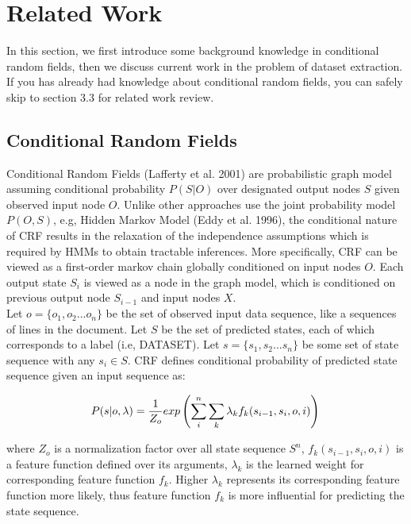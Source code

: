 \documentclass[10pt]{article}
\begin{document}
\section{Related Work}
In this section, we first introduce some background knowledge in conditional random fields, then we discuss current work in the problem of dataset extraction. If you has already had knowledge about conditional random fields, you can safely skip to section 3.3 for related work review.

\subsection{Conditional Random Fields}
Conditional Random Fields (Lafferty et al. 2001) are probabilistic graph model assuming conditional probability $P(S|O)$ over designated output nodes $S$ given observed input node $O$. Unlike other approaches use the joint probability model $P(O,S)$, e.g, Hidden Markov Model (Eddy et al. 1996), the conditional nature of CRF results in the relaxation of the independence assumptions which is required by HMMs to obtain tractable inferences. More specifically, CRF can be viewed as a first-order markov chain globally conditioned on input nodes $O$. Each output state $S_i$ is viewed as a node in the graph model, which is conditioned on previous output node $S_{i-1}$ and input nodes $X$. \\

Let $o =\{o_1, o_2 ... o_n \}$ be the set of observed input data sequence, like a sequences of lines in the document. Let $S$ be the set of predicted states, each of which corresponds to a label (i.e, DATASET). Let $s = \{ s_1, s_2 ... s_n\}$ be some set of state sequence with any $s_i \in S$. CRF defines conditional probability of predicted state sequence given an input sequence as: 

\[
P(s | o,\lambda) = \frac{1}{Z_o} exp \left( \sum_{i}^n \sum_{k} \lambda_{k} f_{k}(s_{i-1}, s_{i}, o, i) \right)  \\
\]

where $Z_o$ is a normalization factor over all state sequence $S^n$, $f_{k}(s_{i-1}, s_{i}, o, i)$ is a feature function defined over its arguments, $\lambda_{k}$ is the learned weight for corresponding feature function $f_k$. Higher $\lambda_{k}$ represents its corresponding feature function more likely, thus feature function $f_k$ is more influential for predicting the state sequence. \\
\end{document}
